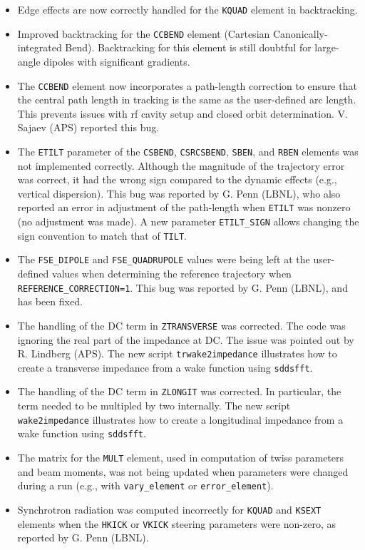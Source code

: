 \documentclass[11pt]{article}
\begin{document}
\begin{itemize}
\item Edge effects are now correctly handled for the \verb|KQUAD| element in backtracking.
\item Improved backtracking for the \verb|CCBEND| element (Cartesian Canonically-integrated Bend). Backtracking
  for this element is still doubtful for large-angle dipoles with significant gradients.
\item The \verb|CCBEND| element now incorporates a path-length correction to ensure that the central path length
  in tracking is the same as the user-defined arc length. This prevents issues with rf cavity setup and closed orbit
  determination. V. Sajaev (APS) reported this bug.
\item The \verb|ETILT| parameter of the \verb|CSBEND|, \verb|CSRCSBEND|, \verb|SBEN|, and \verb|RBEN| elements was not
  implemented correctly. Although the magnitude of the trajectory error was correct, it had the wrong sign compared to the
  dynamic effects (e.g., vertical dispersion). This bug was reported by G. Penn (LBNL), who also reported an error in
  adjustment of the path-length when \verb|ETILT| was nonzero (no adjustment was made).
  A new parameter \verb|ETILT_SIGN| allows changing the sign convention to match that of \verb|TILT|.
\item The \verb|FSE_DIPOLE| and \verb|FSE_QUADRUPOLE| values were being left at the user-defined values when determining
  the reference trajectory when \verb|REFERENCE_CORRECTION=1|. This bug was reported by G. Penn (LBNL), and has been fixed.
\item The handling of the DC term in \verb|ZTRANSVERSE| was corrected. The code was ignoring the real part of the impedance
  at DC. The issue was pointed out by R. Lindberg (APS).
  The new script \verb|trwake2impedance| illustrates how to create a transverse impedance from a wake function using \verb|sddsfft|.
\item The handling of the DC term in \verb|ZLONGIT| was corrected.  In particular, the term needed to be multipled by 
  two internally.  The new script \verb|wake2impedance| illustrates how to create a longitudinal impedance from a wake 
  function using \verb|sddsfft|.
\item The matrix for the \verb|MULT| element, used in computation of twiss parameters and beam moments, was not being updated
  when parameters were changed during a run (e.g., with \verb|vary_element| or \verb|error_element|).
\item Synchrotron radiation was computed incorrectly for \verb|KQUAD| and \verb|KSEXT| elements when the \verb|HKICK| or
  \verb|VKICK| steering parameters were non-zero, as reported by G. Penn (LBNL).
\end{itemize}
\end{document}
